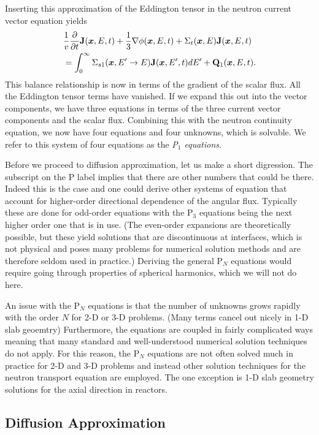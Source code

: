 Inserting this approximation of the Eddington tensor in the neutron current vector equation yields
\begin{align}
  &\frac{1}{v} \frac{ \partial {} }{ \partial {t} } \mathbf{J}(\bm{x},E,t) + \frac{1}{3} \nabla \phi(\bm{x},E,t) + \Sigma_t(\bm{x},E) \mathbf{J}(\bm{x},E,t) \nonumber \\*
  &= \int_0^\infty \Sigma_{s1}(\bm{x}, E' \rightarrow E ) \mathbf{J}(\bm{x},E',t) dE'  + \mathbf{Q}_1(\bm{x},E,t) .
\end{align}
This balance relationship is now in terms of the gradient of the scalar flux. All the Eddington tensor terms have vanished. If we expand this out into the vector components, we have three equations in terms of the three current vector components and the scalar flux. Combining this with the neutron continuity equation, we now have four equations and four unknowns, which is solvable. We refer to this system of four equations as the \emph{P$_1$ equations}.

Before we proceed to diffusion approximation, let us make a short digression. The subscript on the P label implies that there are other numbers that could be there. Indeed this is the case and one could derive other systems of equation that account for higher-order directional dependence of the angular flux. Typically these are done for odd-order equations with the P$_3$ equations being the next higher order one that is in use. (The even-order expansions are theoretically possible, but these yield solutions that are discontinuous at interfaces, which is not physical and poses many problems for numerical solution methods and are therefore seldom used in practice.) Deriving the general P$_N$ equations would require going through properties of spherical harmonics, which we will not do here. 

An issue with the P$_N$ equations is that the number of unknowns grows rapidly with the order $N$ for 2-D or 3-D problems. (Many terms cancel out nicely in 1-D slab geoemtry) Furthermore, the equations are coupled in fairly complicated ways meaning that many standard and well-understood numerical solution techniques do not apply. For this reason, the P$_N$ equations are not often solved much in practice for 2-D and 3-D problems and instead other solution techniques for the neutron transport equation are employed. The one exception is 1-D slab geometry solutions for the axial direction in reactors.

\subsection{Diffusion Approximation}

